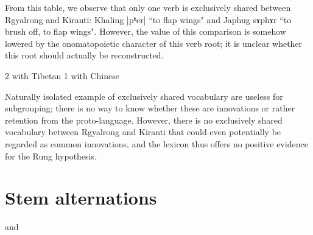 \documentclass[oldfontcommands,oneside,a4paper,11pt]{article}
\newcommand{\ipa}[1]{{\phon #1}} %
\begin{document}
From this table, we observe that only one verb is exclusively shared between Rgyalrong and Kiranti: Khaling |pʰer| ``to flap wings" and Japhug \ipa{sɤphɤr} ``to brush off, to flap wings". However, the value of this comparison is somehow lowered by the 
onomatopoietic character of this verb root; it is unclear whether this root should actually be reconstructed. 

2 with Tibetan
1 with Chinese

Naturally isolated example of exclusively shared vocabulary are useless for subgrouping; there is no way to know whether these are innovations or rather retention from the proto-language. However, there is no exclusively shared vocabulary between Rgyalrong and Kiranti that could even potentially be regarded as common innovations, and the lexicon thus offers no positive evidence for the Rung hypothesis.

\section{Stem alternations}

 


\citet{lapolla92} and  

 




\end{document}
